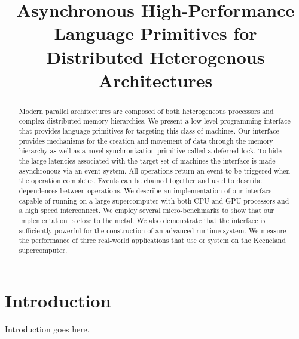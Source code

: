\documentclass{sig-alternate}
\begin{document}
\title{Asynchronous High-Performance Language Primitives for Distributed Heterogenous Architectures}
\author{}
\maketitle

\begin{abstract}
Modern parallel architectures are composed of both heterogeneous processors
and complex distributed memory hierarchies.  We present a low-level programming
interface that provides language primitives for targeting this class of
machines.  Our interface provides mechanisms for the creation and movement
of data through the memory hierarchy as well as a novel synchronization primitive 
called a deferred lock.  To hide the large latencies associated with the target
set of machines the interface is made asynchronous via an event system.  All
operations return an event to be triggered when the operation completes.  Events
can be chained together and used to describe dependences between operations.
We describe an implementation of our interface capable of running on
a large supercomputer with both CPU and GPU processors and a high speed interconnect.
We employ several micro-benchmarks to show that our implementation is close to the metal.
We also demonstrate that the interface is sufficiently powerful for the construction
of an advanced runtime system.  We measure the performance of three real-world applications
that use or system on the Keeneland supercomputer.
\end{abstract}

\section{Introduction}
\label{sect:intro}
Introduction goes here.





{
\small

}
\end{document}
